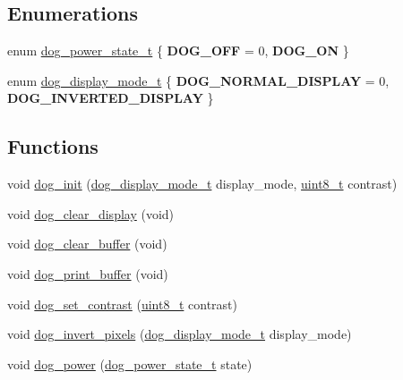 \subsection*{Enumerations}
\begin{DoxyCompactItemize}
\item 
enum \hyperlink{group___d_o_g_m128__common_ga2495b8c4758191a63686e5c316ff2faa}{dog\-\_\-power\-\_\-state\-\_\-t} \{ {\bfseries D\-O\-G\-\_\-\-O\-F\-F} = 0, 
{\bfseries D\-O\-G\-\_\-\-O\-N}
 \}
\item 
enum \hyperlink{group___d_o_g_m128__common_ga596e5903db7b2d54509a1609fa771cfa}{dog\-\_\-display\-\_\-mode\-\_\-t} \{ {\bfseries D\-O\-G\-\_\-\-N\-O\-R\-M\-A\-L\-\_\-\-D\-I\-S\-P\-L\-A\-Y} = 0, 
{\bfseries D\-O\-G\-\_\-\-I\-N\-V\-E\-R\-T\-E\-D\-\_\-\-D\-I\-S\-P\-L\-A\-Y}
 \}
\end{DoxyCompactItemize}
\subsection*{Functions}
\begin{DoxyCompactItemize}
\item 
void \hyperlink{group___d_o_g_m128__common_ga40b518c7bf134a88c694835daae14236}{dog\-\_\-init} (\hyperlink{group___d_o_g_m128__common_ga596e5903db7b2d54509a1609fa771cfa}{dog\-\_\-display\-\_\-mode\-\_\-t} display\-\_\-mode, \hyperlink{group___d_o_g_m128__common_gaba7bc1797add20fe3efdf37ced1182c5}{uint8\-\_\-t} contrast)
\item 
void \hyperlink{group___d_o_g_m128__common_gae14f901eab1ffd8d9f1a23d90e90e45e}{dog\-\_\-clear\-\_\-display} (void)
\item 
void \hyperlink{group___d_o_g_m128__common_ga9a71122564415ade2ee8b8710c668273}{dog\-\_\-clear\-\_\-buffer} (void)
\item 
void \hyperlink{group___d_o_g_m128__common_ga523cc52d34b733fdbcbbca10d11de537}{dog\-\_\-print\-\_\-buffer} (void)
\item 
void \hyperlink{group___d_o_g_m128__common_gafa34efa739ba750a2aa6f5714366d663}{dog\-\_\-set\-\_\-contrast} (\hyperlink{group___d_o_g_m128__common_gaba7bc1797add20fe3efdf37ced1182c5}{uint8\-\_\-t} contrast)
\item 
void \hyperlink{group___d_o_g_m128__common_ga65971023566f90744bfc2b71d542fd64}{dog\-\_\-invert\-\_\-pixels} (\hyperlink{group___d_o_g_m128__common_ga596e5903db7b2d54509a1609fa771cfa}{dog\-\_\-display\-\_\-mode\-\_\-t} display\-\_\-mode)
\item 
void \hyperlink{group___d_o_g_m128__common_gaeaa3ffbecc50e7e8cbd27e6c957b7990}{dog\-\_\-power} (\hyperlink{group___d_o_g_m128__common_ga2495b8c4758191a63686e5c316ff2faa}{dog\-\_\-power\-\_\-state\-\_\-t} state)
\end{DoxyCompactItemize}


